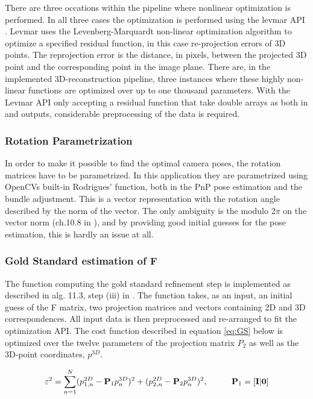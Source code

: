 There are three occations within the pipeline where nonlinear optimization is performed. In all three cases the optimization is performed using the levmar API \cite{levmar}. Levmar uses the Levenberg-Marquardt non-linear optimization algorithm to optimize a specified residual function, in this case re-projection errors of 3D points. The reprojection error is the distance, in pixels, between the projected 3D point and the corresponding point in the image plane. There are, in the implemented 3D-reconstruction pipeline, three instances where these highly non-linear functions are optimized over up to one thousand parameters. With the Levmar API only accepting a residual function that take double arrays as both in and outputs, considerable preprocessing of the data is required.

\subsubsection{Rotation Parametrization}
In order to make it possible to find the optimal camera poses, the rotation matrices have to be parametrized. In this application they are parametrized using OpenCVs built-in Rodrigues' function, both in the PnP pose estimation and the bundle adjustment. This is a vector representation with the rotation angle described by the norm of the vector. The only ambiguity is the modulo $2\pi$ on the vector norm (ch.10.8 in \cite{Klas}), and by providing good initial guesses for the pose estimation, this is hardly an issue at all.

\subsubsection{Gold Standard estimation of F}
The function computing the gold standard refinement step is implemented as described in alg. 11.3, step (iii) in \cite{HZ}. The function takes, as an input, an initial guess of the F matrix, two projection matrices and vectors containing 2D and 3D correspondences. All input data is then preprocessed and re-arranged to fit the optimization API. The cost function described in equation \eqref{eq:GS} below is optimized over the twelve parameters of the projection matrix $P_2$ as well as the 3D-point coordinates, $p^{3D}$. 

\begin{equation}
\label{eq:GS}
\varepsilon^2 = \sum_{n=1}^{N} (p_{1,n}^{2D} - \textbf{P}_1p_{n}^{3D})^2 + (p_{2,n}^{2D} - \textbf{P}_2p_{n}^{3D})^2, \hspace{1cm} \textbf{P}_1 = [\bf{I} | \bf{0}]
\end{equation} 

